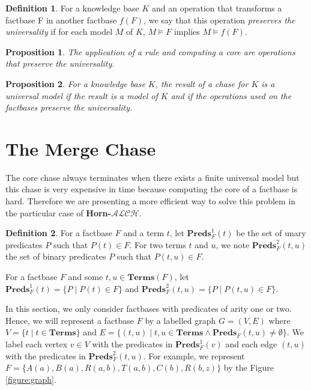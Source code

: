 \documentclass{article}
\newtheorem{proposition}{Proposition}[section]
\theoremstyle{definition}
\newtheorem{definition}{Definition}[section]
\theoremstyle{remark}
\newcommand{\Terms}{\textbf{Terms}}
\newcommand{\Preds}{\textbf{Preds}}
\newcommand{\ALCH}{\textbf{Horn-$\mathcal{ALCH}$}}
\begin{document}
\begin{definition}
For a knowledge base $K$ and an operation that transforms a factbase F in another factbase $f(F)$, we say that this operation \emph{preserves the universality} if for each model $M$ of $K$, $M \models F$ implies $M \models f(F)$. 
\end{definition}

\begin{proposition} \label{universality application}
The application of a rule and computing a core are operations that preserve the universality.
\end{proposition}

\begin{proposition}
For a knowledge base $K$, the result of a chase for $K$ is a universal model if the result is a model of $K$ and if the operations used on the factbases preserve the universality.
\end{proposition}

\section{The Merge Chase}

The core chase always terminates when there exists a finite universal model but this chase is very expensive in time because computing the core of a factbase is hard. Therefore we are presenting a more efficient way to solve this problem in the particular case of \ALCH.

\begin{definition}
For a factbase $F$ and a term $t$, let \emph{$\Preds^1_F(t)$} be the set of unary predicates $P$ such that $P(t)\in F$. For two terms $t$ and $u$, we note \emph{$\Preds^2_F(t,u)$} the set of binary predicates $P$ such that $P(t,u)\in F$. 

For a factbase $F$ and some $t, u \in \Terms(F)$, let $\Preds^1_F(t) = \{P \mid P(t) \in F\}$ and $\Preds^2_F(t, u) = \{P \mid P(t, u) \in F\}$.
\end{definition}

In this section, we only consider factbases with predicates of arity one or two. Hence, we will represent a factbase $F$ by a labelled graph $G = (V,E)$ where $V = \{t \mid t \in \Terms \}$ and $E = \{(t,u) \mid t,u \in \Terms \wedge \Preds_F(t,u) \neq \emptyset\}$. We label each vertex $v \in V$ with the predicates in $\Preds_F^1(v)$ and each edge $(t, u)$ with the predicates in $\Preds^2_F(t, u)$. For example, we represent $F = \{A(a), B(a),R(a,b),T(a,b),C(b),R(b,z)\}$ by the Figure \ref{figure:graph}.
\end{document}
